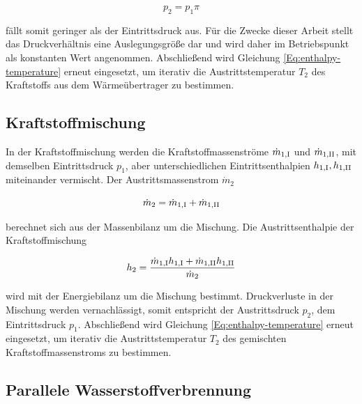 \begin{equation}\label{Eq:pressuredrop}
	p_2 = p_1 \pi
\end{equation}

fällt somit geringer als der Eintrittsdruck aus. Für die Zwecke dieser Arbeit stellt das Druckverhältnis eine Auslegungsgröße dar und wird daher im Betriebspunkt als konstanten Wert angenommen. Abschließend wird Gleichung \ref{Eq:enthalpy-temperature} erneut eingesetzt, um iterativ die Austrittstemperatur $T_2$ des Kraftstoffs aus dem Wärmeübertrager zu bestimmen.

\subsection{Kraftstoffmischung}

In der Kraftstoffmischung werden die Kraftstoffmassenströme $\dot{m}_{1,\mathrm{\rom{1}}}$ und $\dot{m}_{1,\mathrm{\rom{2}}}$, mit demselben Eintrittsdruck $p_1$, aber unterschiedlichen Eintrittsenthalpien $h_{1,\mathrm{\rom{1}}}, h_{1,\mathrm{\rom{2}}}$ miteinander vermischt. Der Austrittsmassenstrom $\dot{m}_2$

\begin{equation}\label{Eq:mass}
	\dot{m}_2 = \dot{m}_{1,\mathrm{\rom{1}}}+\dot{m}_{1,\mathrm{\rom{2}}}
\end{equation}

berechnet sich aus der Massenbilanz um die Mischung. Die Austrittsenthalpie der Kraftstoffmischung 

\begin{equation}\label{Eq:energy-mix}
	h_{2} = \frac{\dot{m}_{1,\mathrm{\rom{1}}}h_{1,\mathrm{\rom{1}}}+\dot{m}_{1,\mathrm{\rom{2}}}h_{1,\mathrm{\rom{2}}}}{\dot{m}_2}
\end{equation}

wird mit der Energiebilanz um die Mischung bestimmt.  Druckverluste in der Mischung werden vernachlässigt, somit entspricht der Austrittsdruck $p_2$, dem Eintrittsdruck $p_1$. Abschließend wird Gleichung \ref{Eq:enthalpy-temperature} erneut eingesetzt, um iterativ die Austrittstemperatur $T_2$ des gemischten Kraftstoffmassenstroms zu bestimmen. 

\subsection{Parallele Wasserstoffverbrennung}

